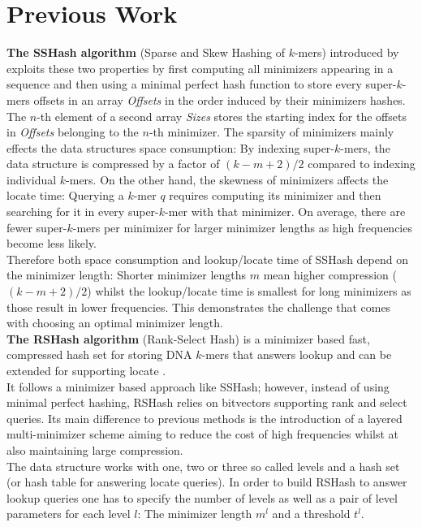 \documentclass[a4paper,titlepage,onecolumn,oneside,12pt,nenglish,titlepage=firstiscover]{scrbook}
\theoremstyle{plain} %
\theoremstyle{definition} %
\theoremstyle{remark} %
\theoremstyle{plain}
\newcommand{\minimizerLength}{m}
\newcommand{\threshold}{t}
\newcommand{\level}{l}
\begin{document}
\chapter{Previous Work} \label{chap:previousWork}
\textbf{The SSHash algorithm} (Sparse and Skew Hashing of $k$-mers) introduced by  exploits these two properties by first computing all minimizers appearing in a sequence and then using a minimal perfect hash function to store every super-$k$-mers offsets in an array \textit{Offsets} in the order induced by their minimizers hashes. The $n$-th element of a second array \textit{Sizes} stores the starting index for the offsets in \textit{Offsets} belonging to the $n$-th minimizer. The sparsity of minimizers mainly effects the data structures space consumption: By indexing super-$k$-mers, the data structure is compressed by a factor of $(k-\minimizerLength+2)/2$ compared to indexing individual $k$-mers. On the other hand, the skewness of minimizers affects the locate time: Querying a $k$-mer $q$ requires computing its minimizer and then searching for it in every super-$k$-mer with that minimizer. On average, there are fewer super-$k$-mers per minimizer for larger minimizer lengths as high frequencies become less likely.\\
Therefore both space consumption and lookup/locate time of SSHash depend on the minimizer length: Shorter minimizer lengths $\minimizerLength$ mean higher compression ($(k-\minimizerLength+2)/2$) whilst the lookup/locate time is smallest for long minimizers as those result in lower frequencies. This demonstrates the challenge that comes with choosing an optimal minimizer length.\\

\newcommand{\infrequent}{\textit{infrequent} }
\newcommand{\frequent}{\textit{frequent} }
\newcommand{\hashfunction}[1]{h_{#1}}
\textbf{The RSHash algorithm} (Rank-Select Hash) is a minimizer based fast, compressed hash set for storing DNA $k$-mers that answers lookup and can be extended for supporting locate \cite{schulte-mattler_rshash_2026}.\\
It follows a minimizer based approach like SSHash; however, instead of using minimal perfect hashing, RSHash relies on bitvectors supporting rank and select queries. Its main difference to previous methods is the introduction of a layered multi-minimizer scheme aiming to reduce the cost of high frequencies whilst at also maintaining large compression.\\
The data structure works with one, two or three so called levels and a hash set (or hash table for answering locate queries). In order to build RSHash to answer lookup queries one has to specify the number of levels as well as a pair of level parameters for each level $\level$: The minimizer length $\minimizerLength^\level$ and a threshold $\threshold^\level$.\\
\end{document}
